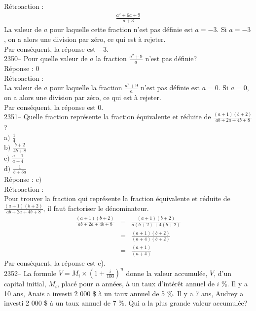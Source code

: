 \documentclass[letterpaper, 12pt]{article}
\begin{document}
R\'etroaction :\\
\begin{eqnarray*}
\frac{a^{2}+6a+9}{a+3}
\end{eqnarray*}
La valeur de $a$ pour laquelle cette fraction n'est pas d\'efinie est $a=-3$. Si $a=-3$, on a alors une division par z\'ero, ce qui est \`a rejeter.\\
Par cons\'equent, la r\'eponse est $-3$.\\

2350-- Pour quelle valeur de $a$ la fraction $\frac{a^{2}+9}{a}$ n'est pas d\'efinie?\\

R\'eponse : 0\\

R\'etroaction :\\
La valeur de $a$ pour laquelle la fraction $\frac{a^{2}+9}{a}$ n'est pas d\'efinie est $a=0$. Si $a=0$, on a alors une division par z\'ero, ce qui est \`a rejeter.\\
Par cons\'equent, la r\'eponse est 0.\\

2351-- Quelle fraction repr\'esente la fraction \'equivalente et r\'eduite de $\frac{(a+1)(b+2)}{ab+2a+4b+8}$?\\[2mm]

a$)$ $\frac{1}{4}$\\[2mm]
b$)$ $\frac{b+2}{4b+8}$\\[2mm]
c$)$ $\frac{a+1}{a+4}$\\[2mm]
d$)$ $\frac{1}{b+3a}$\\

R\'eponse : c$)$\\

R\'etroaction :\\
Pour trouver la fraction qui repr\'esente la fraction \'equivalente et r\'eduite de $\frac{(a+1)(b+2)}{ab+2a+4b+8}$, il faut factoriser le d\'enominateur.
\begin{eqnarray*}
\frac{(a+1)(b+2)}{ab+2a+4b+8}&=&\frac{(a+1)(b+2)}{a(b+2)+4(b+2)}\\[2mm]
&=&\frac{(a+1)(b+2)}{(a+4)(b+2)}\\[2mm]
&=&\frac{(a+1)}{(a+4)}
\end{eqnarray*}
Par cons\'equent, la r\'eponse est c).\\


2352-- La formule $V=M_{i}\times(1+\frac{i}{100})^{n}$ donne la valeur accumul\'ee, $V$, d'un capital initial, $M_{i}$, plac\'e pour $n$ ann\'ees, \`a un taux d'int\'er\^et annuel de $i$ \%. Il y a 10 ans, Anais a investi 2 000 \$ \`a un taux annuel de 5 \%. Il y a 7 ans, Audrey a investi 2 000 \$ \`a un taux annuel de 7 \%. Qui a la plus grande valeur accumul\'ee?\\
\end{document}
